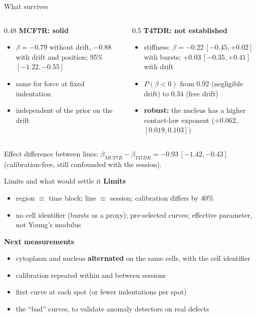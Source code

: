 \documentclass[aspectratio=169,10pt]{beamer}
\begin{document}
\begin{frame}{What survives}
\begin{columns}[T]
\begin{column}{0.48\textwidth}
\textbf{MCF7R: solid}
\begin{itemize}
\item $\beta=-0.79$ without drift, $-0.88$ with drift and position; 95\% $[-1.22,-0.55]$
\item same for force at fixed indentation
\item independent of the prior on the drift
\end{itemize}
\end{column}
\begin{column}{0.5\textwidth}
\textbf{T47DR: not established}
\begin{itemize}
\item stiffness: $\beta=-0.22\,[-0.45,+0.02]$ with bursts; $+0.03\,[-0.35,+0.41]$ with drift
\item $P(\beta<0)$ from 0.92 (negligible drift) to 0.34 (free drift)
\item \textbf{robust:} the nucleus has a higher contact-law exponent ($+0.062$, $[0.019,0.103]$)
\end{itemize}
\end{column}
\end{columns}
\medskip
Effect difference between lines: $\beta_{MCF7R}-\beta_{T47DR}=-0.93\,[-1.42,-0.43]$ (calibration-free, still confounded with the session).
\end{frame}

\begin{frame}{Limits and what would settle it}
\textbf{Limits}
\begin{itemize}
\item region $\equiv$ time block; line $\equiv$ session; calibration differs by 40\%
\item no cell identifier (bursts as a proxy); pre-selected curves; effective parameter, not Young's modulus
\end{itemize}
\bigskip
\textbf{Next measurements}
\begin{itemize}
\item cytoplasm and nucleus \textbf{alternated} on the same cells, with the cell identifier
\item calibration repeated within and between sessions
\item first curve at each spot (or fewer indentations per spot)
\item the ``bad'' curves, to validate anomaly detectors on real defects
\end{itemize}
\end{frame}
\end{document}

